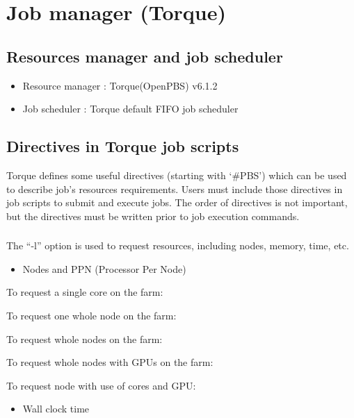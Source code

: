 \documentclass[letterpaper,10pt,english]{sphinxmanual}
\begin{document}
\section{Job manager (Torque)}
\label{\detokenize{guide:job-manager-torque}}

\subsection{Resources manager and job scheduler}
\label{\detokenize{guide:resources-manager-and-job-scheduler}}\begin{itemize}
\item {} 
Resource manager : Torque(OpenPBS) v6.1.2

\item {} 
Job scheduler : Torque default FIFO job scheduler

\end{itemize}


\subsection{Directives in Torque job scripts}
\label{\detokenize{guide:directives-in-torque-job-scripts}}
Torque defines some useful directives (starting with ‘\#PBS’) which can be used to describe job’s resources requirements. Users must include those directives in job scripts to submit and execute jobs.
The order of directives is not important, but the directives must be written prior to job execution commands.


\subsubsection{}
\label{\detokenize{guide:resource-limits}}
The “-l” option is used to request resources, including nodes, memory, time, etc.
\begin{itemize}
\item {} 
Nodes and PPN (Processor Per Node)

\end{itemize}

\begin{sphinxVerbatim}[commandchars=\\\{\}]
To request a single core on the farm:

To request one whole node on the farm:

To request  whole nodes on the farm:

To request  whole nodes with  GPUs on the farm:

To request  node with use of  cores and  GPU:
\end{sphinxVerbatim}
\begin{itemize}
\item {} 
Wall clock time

\end{itemize}
\end{document}
